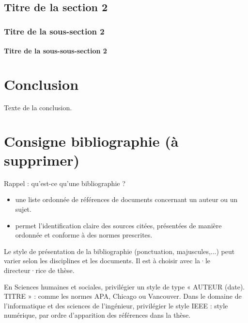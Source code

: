 \documentclass[a4paper,11pt,twoside,openright,notitlepage]{book}
\begin{document}
\newpage
\section{Titre de la section 2}
\subsection{Titre de la sous-section 2}
\subsubsection{Titre de la sous-sous-section 2}




\chapter*{Conclusion}
\adjustmtc
{}
\newpage

Texte de la conclusion. \\


\cleardoublepage{}
{}

\thispagestyle{empty}
\chapter*{Consigne bibliographie (à supprimer)} %

Rappel : qu’est-ce qu’une bibliographie ?
\begin{itemize}
\item une liste ordonnée de références de documents concernant un auteur ou un sujet.
\item permet l’identification claire des sources citées, présentées de manière ordonnée et conforme à des normes prescrites.
\end{itemize}

Le style de présentation de la bibliographie (ponctuation, majuscules,...) peut varier selon les disciplines et les documents. Il est à choisir avec la·le directeur·rice de thèse.
 
En Sciences humaines et sociales, privilégier un style de type « AUTEUR (date). TITRE » : comme les normes APA, Chicago ou Vancouver.
Dans le domaine de l’informatique et des sciences de l’ingénieur, privilégier le style IEEE : style numérique, par ordre d’apparition des références dans la thèse.
 
\end{document}
